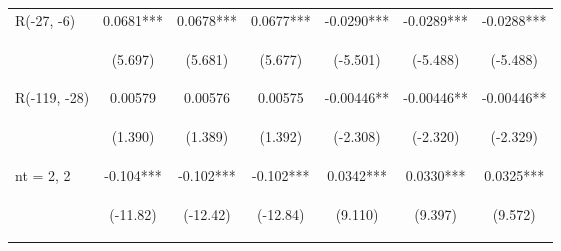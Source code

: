 \documentclass[]{article}
\begin{document}
\begin{center}
\begin{tabular}{lcccccc}
R(-27, -6) & 0.0681*** & 0.0678*** & 0.0677*** & -0.0290*** & -0.0289*** & -0.0288*** \\
\vspace{4pt} & \begin{footnotesize}(5.697)\end{footnotesize} & \begin{footnotesize}(5.681)\end{footnotesize} & \begin{footnotesize}(5.677)\end{footnotesize} & \begin{footnotesize}(-5.501)\end{footnotesize} & \begin{footnotesize}(-5.488)\end{footnotesize} & \begin{footnotesize}(-5.488)\end{footnotesize} \\
R(-119, -28) & 0.00579 & 0.00576 & 0.00575 & -0.00446** & -0.00446** & -0.00446** \\
\vspace{4pt} & \begin{footnotesize}(1.390)\end{footnotesize} & \begin{footnotesize}(1.389)\end{footnotesize} & \begin{footnotesize}(1.392)\end{footnotesize} & \begin{footnotesize}(-2.308)\end{footnotesize} & \begin{footnotesize}(-2.320)\end{footnotesize} & \begin{footnotesize}(-2.329)\end{footnotesize} \\
nt = 2, 2 & -0.104*** & -0.102*** & -0.102*** & 0.0342*** & 0.0330*** & 0.0325*** \\
\vspace{4pt} & \begin{footnotesize}(-11.82)\end{footnotesize} & \begin{footnotesize}(-12.42)\end{footnotesize} & \begin{footnotesize}(-12.84)\end{footnotesize} & \begin{footnotesize}(9.110)\end{footnotesize} & \begin{footnotesize}(9.397)\end{footnotesize} & \begin{footnotesize}(9.572)\end{footnotesize} \\

\end{tabular}
\end{center}
\end{document}
